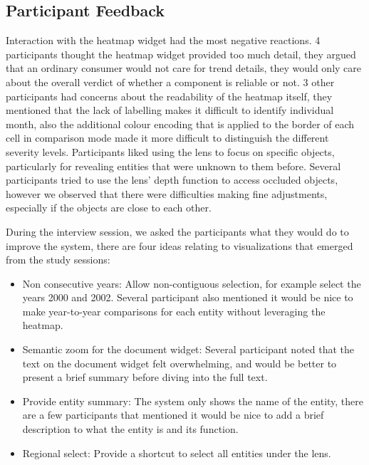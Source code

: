 \subsection{Participant Feedback}
Interaction with the heatmap widget had the most negative reactions. 4
participants thought the heatmap widget provided too much detail, they argued
that an ordinary consumer would not care for trend details, they would only care
about the overall verdict of whether a component is reliable or not. 3 other
participants had concerns about the readability of the heatmap itself, they
mentioned that the lack of labelling makes it difficult to identify individual
month, also the additional colour encoding that is applied to the border of each
cell in comparison mode made it more difficult to distinguish the different
severity levels. Participants liked using the lens to focus on specific
objects, particularly for revealing entities that were unknown to them
before. Several participants tried to use the lens' depth function to access
occluded objects, however we observed that there were difficulties making fine
adjustments, especially if the objects are close to each other. 
  
During the interview session, we asked the participants what they would do to
improve the system, there are four ideas relating to visualizations that emerged
from the study sessions:
\begin{itemize}[noitemsep]
  \item Non consecutive years: Allow non-contiguous selection, for
  example select the years 2000 and 2002. Several participant also mentioned it
  would be nice to make year-to-year comparisons for each entity without
  leveraging the heatmap.
  
  \item Semantic zoom for the document widget: Several participant noted that
  the text on the document widget felt overwhelming, and would be better to
  present a brief summary before diving into the full text.
  
  \item Provide entity summary: The system only shows the name of the entity,
  there are a few participants that mentioned it would be nice to add a brief
  description to what the entity is and its function.
  
  \item Regional select: Provide a shortcut to select all entities under the
  lens.
\end{itemize}
   
